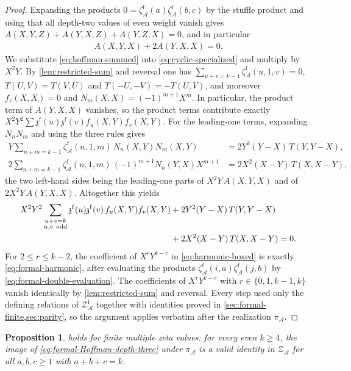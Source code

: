 \documentclass[12pt]{amsart}
\numberwithin{equation}{section}
\theoremstyle{plain}
\newtheorem{prop}[prop]{Proposition}
\newcommand{\odd}{\mathrm{odd}}
\newcommand{\ZA}{{\mathcal Z_{\mathcal A}}}
\newcommand{\ZAf}{{\mathcal Z_{\mathcal A}^{\mathrm f}}}
\newcommand{\zaf}[1]{\zeta_{\mathcal A}^{\mathrm f}(#1)}
\newcommand{\zzf}[1]{\mathfrak z^{\mathrm f}(#1)}
\begin{document}
\begin{proof}
Expanding the products $0=\zaf a\zaf{b,c}$ by the stuffle product and
using that all depth-two values of even weight vanish gives
$A(X,Y,Z)+A(Y,X,Z)+A(Y,Z,X)=0$, and in particular
\begin{align}\label{eq:cyclic-specialized}
 A(X,Y,X)+2A(Y,X,X)=0.
\end{align}
We substitute \eqref{eq:hoffman-summed} into
\eqref{eq:cyclic-specialized} and multiply by $X^2Y$. By
\cref{lem:restricted-sum} and reversal one has
$\sum_{u+v=k-1}\zaf{u,1,v}=0$, $T(U,V)=T(V,U)$ and
$T(-U,-V)=-T(U,V)$, and moreover $f_v(X,X)=0$ and
$N_m(X,X)=(-1)^{m+1}X^m$. In particular, the product term of
$A(Y,X,X)$ vanishes, so the product terms contribute exactly
$X^2Y^2\sum\zzf u\zzf v f_u(X,Y)f_v(X,Y)$. For the leading-one terms,
expanding $N_nN_m$ and using the three rules gives
\begin{align*}
 Y\sum_{n+m=k-1}\zaf{n,1,m}\,N_n(X,Y)N_m(X,Y)
 &=2Y^2(Y-X)\,T(Y,Y-X),\\
 2\sum_{n+m=k-1}\zaf{n,1,m}\,(-1)^{m+1}N_n(Y,X)X^{m+1}
 &=2X^2(X-Y)\,T(X,X-Y),
\end{align*}
the two left-hand sides being the leading-one parts of
$X^2Y\,A(X,Y,X)$ and of $2X^2Y\,A(Y,X,X)$. Altogether this
yields
\begin{align}\label{eq:harmonic-boxed}
 X^2Y^2\sum_{\substack{u+v=k\\u,v\ \odd}}
 \zzf u\zzf v\,f_u(X,Y)f_v(X,Y)
 &+2Y^2(Y-X)\,T(Y,Y-X)\notag\\
 &+2X^2(X-Y)\,T(X,X-Y)=0.
\end{align}
For $2\leq r\leq k-2$, the coefficient of $X^rY^{k-r}$ in
\eqref{eq:harmonic-boxed} is exactly \eqref{eq:formal-harmonic}, after
evaluating the products $\zaf{i,a}\zaf{j,b}$ by
\eqref{eq:formal-double-evaluation}. The coefficients of
$X^rY^{k-r}$ with $r\in\{0,1,k-1,k\}$ vanish identically by
\cref{lem:restricted-sum} and reversal. Every step used only the
defining relations of $\ZAf$ together with identities proved in
\cref{sec:formal-finite,sec:parity}, so the argument applies verbatim
after the realization $\pi_{\mathcal A}$.
\end{proof}

\begin{prop}\label{prop:finite-hoffman-duality}
 holds for finite multiple zeta values: for
every even $k\geq4$, the image of
\eqref{eq:formal-Hoffman-depth-three} under
$\pi_{\mathcal A}$ is a valid identity in $\ZA$ for all
$a,b,c\geq1$ with $a+b+c=k$.
\end{prop}
\end{document}
